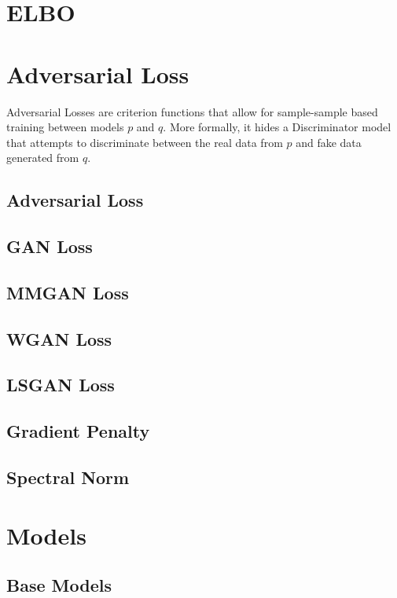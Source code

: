 \documentclass{article}
\begin{document}
\section{ELBO}


\section{Adversarial Loss}
Adversarial Losses are criterion functions that allow for sample-sample based
training between models $p$ and $q$. More formally, it hides a Discriminator
model that attempts to discriminate between the real data from $p$ and fake data
generated from $q$.
\subsection{Adversarial Loss}
\subsection{GAN Loss}
\subsection{MMGAN Loss}
\subsection{WGAN Loss}
\subsection{LSGAN Loss}
\subsection{Gradient Penalty}
\subsection{Spectral Norm}


\section{Models}
\subsection{Base Models}
\end{document}
